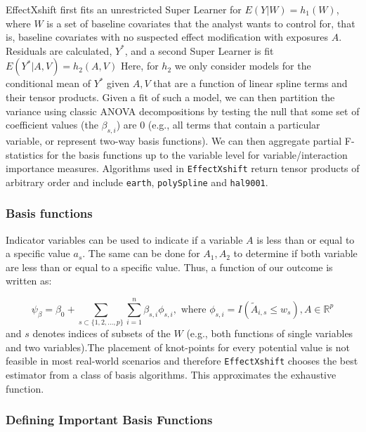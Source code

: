 \documentclass[
]{article}
\begin{document}
EffectXshift first fits an unrestricted Super Learner for
\(E(Y|W) = h_1(W)\), where \(W\) is a set of baseline covariates that
the analyst wants to control for, that is, baseline covariates with no
suspected effect modification with exposures \(A\). Residuals are
calculated, \(Y^*\), and a second Super Learner is fit
\(E(Y^*|A,V) = h_2(A,V)\) Here, for \(h_2\) we only consider models for
the conditional mean of \(Y^*\) given \(A,V\) that are a function of
linear spline terms and their tensor products. Given a fit of such a
model, we can then partition the variance using classic ANOVA
decompositions by testing the null that some set of coefficient values
(the \(\beta_{s,i}\)) are 0 (e.g., all terms that contain a particular
variable, or represent two-way basis functions). We can then aggregate
partial F-statistics for the basis functions up to the variable level
for variable/interaction importance measures. Algorithms used in
\texttt{EffectXshift} return tensor products of arbitrary order and include
\texttt{earth}, \texttt{polySpline} and \texttt{hal9001}.

\hypertarget{basis-functions}{%
\subsubsection{Basis functions}\label{basis-functions}}

Indicator variables can be used to indicate if a variable \(A\) is less
than or equal to a specific value \(a_s\). The same can be done for
\(A_1, A_2\) to determine if both variable are less than or equal to a
specific value. Thus, a function of our outcome is written as:

\[\psi_{\beta} = \beta_0 + \sum_{s\subset \{1,2,...,p\}}\sum_{i=1}^{n} \beta_{s,i} \phi_{s,i},
    \text{ where } \phi_{s,i} = I(\tilde{A}_{i,s} \leq w_s), A \in \mathbb{R}^p\]
and \(s\) denotes indices of subsets of the \(W\) (e.g., both functions
of single variables and two variables).The placement of knot-points for
every potential value is not feasible in most real-world scenarios and
therefore \texttt{EffectXshift} chooses the best estimator from a class of
basis algorithms. This approximates the exhaustive function.

\hypertarget{defining-important-basis-functions}{%
\subsubsection{Defining Important Basis
Functions}\label{defining-important-basis-functions}}
\end{document}
